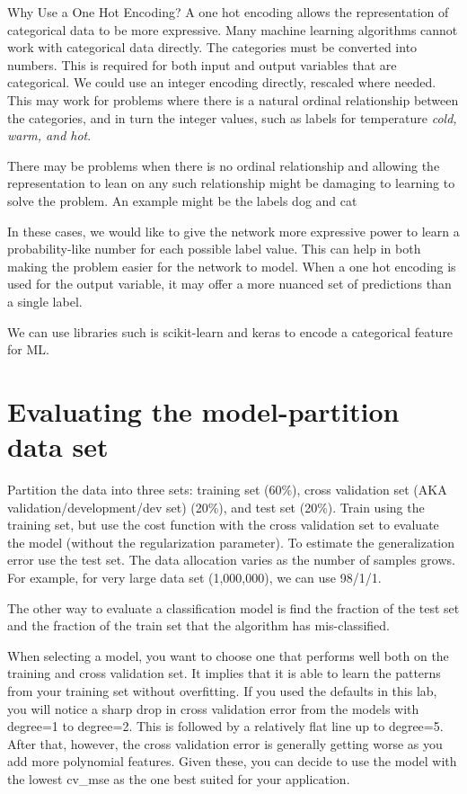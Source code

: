 \documentclass[12pt]{report}
\begin{document}
Why Use a One Hot Encoding?
A one hot encoding allows the representation of categorical data to be more expressive. Many machine learning algorithms cannot work with categorical data directly. The categories must be converted into numbers. This is required for both input and output variables that are categorical. We could use an integer encoding directly, rescaled where needed. This may work for problems where there is a natural ordinal relationship between the categories, and in turn the integer values, such as labels for temperature \textit{cold, warm, and hot}.

There may be problems when there is no ordinal relationship and allowing the representation to lean on any such relationship might be damaging to learning to solve the problem. An example might be the labels dog and cat

In these cases, we would like to give the network more expressive power to learn a probability-like number for each possible label value. This can help in both making the problem easier for the network to model. When a one hot encoding is used for the output variable, it may offer a more nuanced set of predictions than a single label.

We can use libraries such is scikit-learn and keras to encode a categorical feature for ML.

\section{Evaluating the model-partition data set}

Partition the data into three sets: training set (60\%), cross validation set (AKA validation/development/dev set) (20\%), and test set (20\%). Train using the training set, but use the cost function with the cross validation set to evaluate the model (without the regularization parameter). To estimate the generalization error use the test set. The data allocation varies as the number of samples grows. For example, for very large data set (1,000,000), we can use 98/1/1.

The other way to evaluate a classification model is find the fraction of the test set and the fraction of the train set that the algorithm has mis-classified.

When selecting a model, you want to choose one that performs well both on the training and cross validation set. It implies that it is able to learn the patterns from your training set without overfitting. If you used the defaults in this lab, you will notice a sharp drop in cross validation error from the models with degree=1 to degree=2. This is followed by a relatively flat line up to degree=5. After that, however, the cross validation error is generally getting worse as you add more polynomial features. Given these, you can decide to use the model with the lowest cv\_mse as the one best suited for your application.
\end{document}

